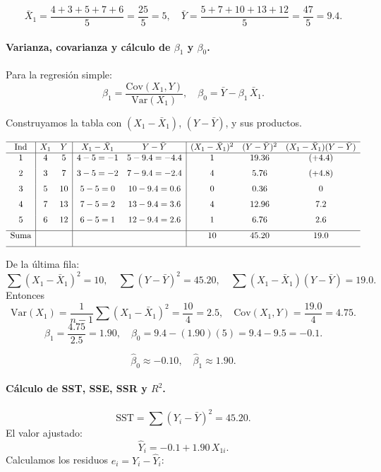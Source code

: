 \documentclass[10pt,a4paper]{article}
\begin{document}
\begin{enumerate}
\[
\bar{X}_1
= \frac{4+3+5+7+6}{5}
= \frac{25}{5}
= 5,
\quad
\bar{Y}
= \frac{5+7+10+13+12}{5}
= \frac{47}{5}
= 9.4.
\]

\paragraph{Varianza, covarianza y c\'alculo de $\beta_1$ y $\beta_0$.}

Para la regresión simple:
\[
\beta_1
= \frac{\mathrm{Cov}(X_1,Y)}{\mathrm{Var}(X_1)},
\quad
\beta_0
= \bar{Y} - \beta_1\,\bar{X}_1.
\]

Construyamos la tabla con $(X_1-\bar{X}_1)$, $(Y-\bar{Y})$, y sus productos.

\[
\begin{array}{c|cc|cc|ccc}
\hline
\text{Ind} & X_1 & Y 
& X_1-\bar{X}_1 & Y-\bar{Y}
& (X_1 - \bar{X}_1)^2 & (Y - \bar{Y})^2
& (X_1-\bar{X}_1)(Y-\bar{Y})\\
\hline
1 & 4 & 5 
& 4-5=-1
& 5-9.4=-4.4
& 1
& 19.36
& (+4.4) \\[6pt]
2 & 3 & 7
& 3-5=-2
& 7-9.4=-2.4
& 4
& 5.76
& (+4.8) \\[6pt]
3 & 5 & 10
& 5-5=0
& 10-9.4=0.6
& 0
& 0.36
& 0 \\[6pt]
4 & 7 & 13
& 7-5=2
& 13-9.4=3.6
& 4
& 12.96
& 7.2 \\[6pt]
5 & 6 & 12
& 6-5=1
& 12-9.4=2.6
& 1
& 6.76
& 2.6 \\[6pt]
\hline
\text{Suma} & & & & 
& 10
& 45.20
& 19.0 \\[6pt]
\hline
\end{array}
\]

De la última fila:
\[
\sum (X_1-\bar{X}_1)^2 = 10,
\quad
\sum (Y - \bar{Y})^2 = 45.20,
\quad
\sum (X_1-\bar{X}_1)(Y-\bar{Y}) = 19.0.
\]
Entonces
\[
\mathrm{Var}(X_1)
= \frac{1}{n-1}\sum (X_1-\bar{X}_1)^2
= \frac{10}{4}
= 2.5,
\quad
\mathrm{Cov}(X_1,Y)
= \frac{19.0}{4}
= 4.75.
\]
\[
\beta_1
= \frac{4.75}{2.5}
= 1.90,
\quad
\beta_0
= 9.4 - (1.90)(5)
= 9.4 - 9.5
= -0.1.
\]

\[
\boxed{
\widehat{\beta}_0 \approx -0.10,
\quad
\widehat{\beta}_1 \approx 1.90.
}
\]

\paragraph{ C\'alculo de SST, SSE, SSR y $R^2$.}

\[
\text{SST}
= \sum (Y_i - \bar{Y})^2
= 45.20.
\]
El valor ajustado: 
\[
\hat{Y}_i
= -0.1 +1.90\,X_{1i}.
\]
Calculamos los residuos $e_i = Y_i - \hat{Y}_i$:


\end{enumerate}
\end{document}
